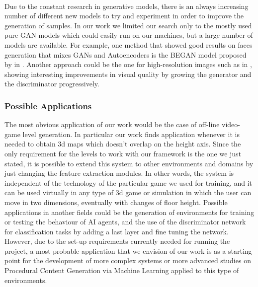 \paragraph{} Due to the constant research in generative models, there is an always increasing number of different new models to try and experiment in order to improve the generation of samples. In our work we limited our search only to the mostly used pure-GAN models which could easily run on our machines, but a large number of models are available.
For example, one method that showed good results on faces generation that mixes GANs and Autoencoders is the BEGAN model proposed by \citeauthor{gan:BEGAN} in \cite{gan:BEGAN}. Another approach could be the one for high-resolution images such as in \textit{} \cite{gan:high-res}, showing interesting improvements in visual quality by growing the generator and the discriminator progressively.

\subsubsection{Possible Applications}
The most obvious application of our work would be the case of off-line video-game level generation. In particular our work finds application whenever it is needed to obtain 3d maps which doesn't overlap on the height axis. Since the only requirement for the levels to work with our framework is the one we just stated, it is possible to extend this system to other environments and domains by just changing the feature extraction modules. In other words, the system is independent of the technology of the particular game we used for training, and it can be used virtually in any type of 3d game or simulation in which the user can move in two dimensions, eventually with changes of floor height. Possible applications in another fields could be the generation of environments for training or testing the behaviour of AI agents, and the use of the discriminator network for classification tasks by adding a last layer and fine tuning the network. However, due to the set-up requirements currently needed for running the project, a most probable application that we envision of our work is as a starting point for the development of more complex systems or more advanced studies on Procedural Content Generation via Machine Learning applied to this type of environments.

